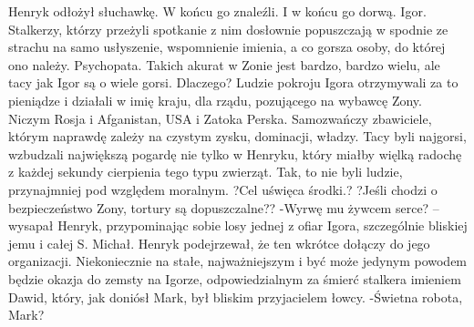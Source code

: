 \documentclass[../MAIN.tex]{subfiles}
\begin{document}
Henryk odłożył słuchawkę.
W końcu go znaleźli. I w końcu go dorwą.
Igor.
Stalkerzy, którzy przeżyli spotkanie z nim dosłownie popuszczają w spodnie ze strachu na samo usłyszenie, wspomnienie imienia, a co gorsza osoby, do której ono należy.
Psychopata.
Takich akurat w Zonie jest bardzo, bardzo wielu, ale tacy jak Igor są o wiele gorsi. Dlaczego?
Ludzie pokroju Igora otrzymywali za to pieniądze i działali w imię kraju, dla rządu, pozującego na wybawcę Zony. Niczym Rosja i Afganistan, USA i Zatoka Perska. Samozwańczy zbawiciele, którym naprawdę zależy na czystym zysku, dominacji, władzy.
Tacy byli najgorsi, wzbudzali największą pogardę nie tylko w Henryku, który miałby więlką radochę z każdej sekundy cierpienia tego typu zwierząt. Tak, to nie byli ludzie, przynajmniej pod względem moralnym.
?Cel uświęca środki.?
?Jeśli chodzi o bezpieczeństwo Zony, tortury są dopuszczalne??
-Wyrwę mu żywcem serce? -- wysapał Henryk, przypominając sobie losy jednej z ofiar Igora, szczególnie bliskiej jemu i całej S.
Michał.
Henryk podejrzewał, że ten wkrótce dołączy do jego organizacji. Niekoniecznie na stałe, najważniejszym i być może jedynym powodem będzie okazja do zemsty na Igorze, odpowiedzialnym za śmierć stalkera imieniem Dawid, który, jak doniósł Mark, był bliskim przyjacielem łowcy.
-Świetna robota, Mark?
\end{document}
